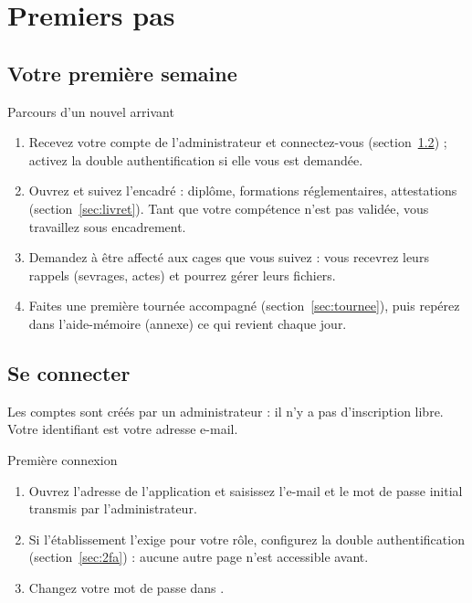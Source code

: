 \documentclass[11pt,a4paper]{article}
\begin{document}
\newpage
\tableofcontents
\newpage

\section{Premiers pas}\label{sec:premiers}

\subsection{Votre première semaine}
\begin{procedure}{Parcours d'un nouvel arrivant}
\begin{enumerate}
  \item Recevez votre compte de l'administrateur et connectez-vous
    (section~\ref{sec:connexion}) ; activez la double authentification si
    elle vous est demandée.
  \item Ouvrez  et suivez
    l'encadré  : diplôme, formations
    réglementaires, attestations (section~\ref{sec:livret}). Tant que votre
    compétence n'est pas validée, vous travaillez sous encadrement.
  \item Demandez à être affecté aux cages que vous suivez : vous recevrez
    leurs rappels (sevrages, actes) et pourrez gérer leurs fichiers.
  \item Faites une première tournée accompagné (section~\ref{sec:tournee}),
    puis repérez dans l'aide-mémoire (annexe) ce qui revient chaque jour.
\end{enumerate}
\end{procedure}

\subsection{Se connecter}\label{sec:connexion}
Les comptes sont créés par un administrateur : il n'y a pas d'inscription
libre. Votre identifiant est votre adresse e-mail.

\begin{procedure}{Première connexion}
\begin{enumerate}
  \item Ouvrez l'adresse de l'application et saisissez l'e-mail et le mot de
    passe initial transmis par l'administrateur.
  \item Si l'établissement l'exige pour votre rôle, configurez la double
    authentification (section~\ref{sec:2fa}) : aucune autre page n'est
    accessible avant.
  \item Changez votre mot de passe dans .
\end{enumerate}
\end{procedure}
\end{document}
